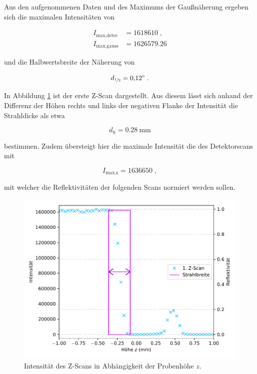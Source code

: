 Aus den aufgenommenen Daten und des Maximums der Gaußnäherung ergeben sich die maximalen
Intensitäten von 
\vspace{-25pt}

\begin{align*}
    I_\text{max,detec} &= \num{1618610} \; ,\\
    I_\text{max,gauss} &= \num{1626579.26}
\end{align*}

und die Halbwertsbreite der Näherung von

\begin{equation*}
    d_{\sfrac{1}{2}} = \SI{0.12}{\degree} \; .
\end{equation*}

In Abbildung \ref{fig:plot21} ist der erste Z-Scan dargestellt.
Aus diesem lässt sich anhand der Differenz der Höhen rechts und links der negativen Flanke der Intensität
die Strahldicke als etwa

\begin{equation*}
    d_\text{S} = \SI{0.28}{\milli\meter}
\end{equation*}

bestimmen. Zudem übersteigt hier die maximale Intensität die des Detektorscans mit 

\begin{equation*}
    I_\text{max,z} = \num{1636650} \; ,
\end{equation*}

mit welcher die Reflektivitäten der folgenden Scans normiert werden sollen.

\begin{figure}[H]
    \centering
    \includegraphics[scale=0.7]{content/plot21.pdf}
    \vspace{-10pt}
    \caption{Intensität des Z-Scans in Abhängigkeit der Probenhöhe $z$.}
    \label{fig:plot21}
\end{figure}

